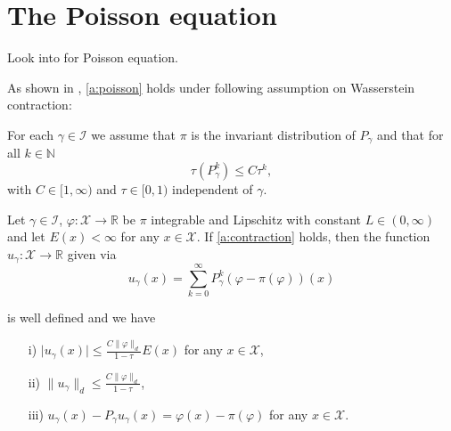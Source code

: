 \section{The Poisson equation}

Look into \cite{douc2018markov} for Poisson equation. 

As shown in \cite{hofstadler2024sureconvergenceratesadaptive}, \ref{a:poisson} holds under following assumption on Wasserstein contraction:

\begin{assumption}
\label{a:contraction}
For each $\gamma \in \mathcal{I}$ we assume that $\pi$ is the invariant distribution of $P_\gamma$ and that for all $k \in \mathbb{N}$ 
\[
\tau(P_\gamma^k) \leq C \tau^k,
\]
with $C \in [1, \infty)$ and $\tau \in [0,1)$  independent of $\gamma$.
\end{assumption} 


\begin{proposition}\label{prop:poisson_equation_wasserstein_setting}
Let $\gamma \in \mathcal{I}$, $ \varphi \colon \mathcal{X} \to \mathbb{R}$ be $\pi$ integrable and Lipschitz with constant $L \in (0, \infty)$ and let $E (x) < \infty$ for any $x \in \mathcal{X}$. 
If \ref{a:contraction} holds, then the function $u_\gamma\colon \mathcal{X} \to \mathbb{R}$ given via 
\begin{equation}
    \label{eq:poisson-neumann}
    u_\gamma(x) = \sum_{k=0}^\infty P_\gamma^k \left( \varphi - \pi(\varphi) \right)(x)
\end{equation}

is well defined and we have
\begin{itemize}
\item[i)] $\vert u_\gamma (x) \vert \leq \frac{C \| \varphi \|_{d}}{1- \tau} E(x)$ for any $x \in \mathcal{X}$,
\item[ii)] $\| u_\gamma \|_d \leq \frac{C \| \varphi \|_{d}}{1- \tau} $,
\item[iii)] $u_\gamma (x) - P_\gamma u_\gamma(x) = \varphi(x) - \pi(\varphi)$ for any $x \in \mathcal{X}$.
\end{itemize}

\end{proposition}

